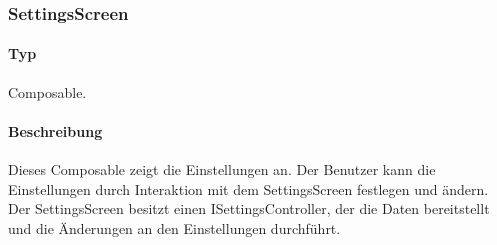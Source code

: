 \subsubsection{SettingsScreen}
\paragraph*{Typ}
Composable.
\paragraph*{Beschreibung}
Dieses Composable zeigt die Einstellungen an. 
Der Benutzer kann die Einstellungen durch Interaktion mit dem SettingsScreen festlegen und ändern.\\
Der SettingsScreen besitzt einen ISettingsController, der die Daten bereitstellt und die Änderungen an den Einstellungen durchführt. 

